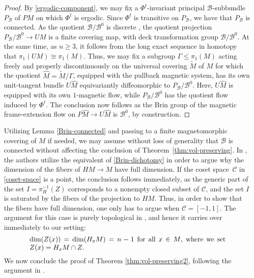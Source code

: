 \documentclass[10pt,a4paper]{amsart}
\numberwithin{equation}{section}
\theoremstyle{definition}
\begin{document}
\begin{proof}
 By \eqref{ergodic-component}, we may fix a $\Phi^t$-invariant principal $\mathcal{B}$-subbundle $P_{\mathcal{B}}$ of $PM$ on which $\Phi^t$ is ergodic. Since $\Phi^t$ is transitive on $P_{\mathcal{B}}$, we have that $P_{\mathcal{B}}$ is connected. As the quotient $\mathcal{B}/\mathcal{B}^0$ is discrete \cite[Proposition 6.15]{MR4242835}, the quotient projection $P_{\mathcal{B}} / \mathcal{B}^0 \to UM$ is a finite covering map, with deck transformation group $\mathcal{B}/\mathcal{B}^0$. At the same time, as $n\geq 3$, it follows from the long exact sequence in homotopy that $\pi_1(UM)\cong \pi_1(M)$. Thus, we may fix a subgroup $\Gamma \leq \pi_1(M)$ acting freely and properly discontinuously on the universal covering $\widetilde{M}$ of $M$ for which the quotient $\hat{M} = \widetilde{M}/\Gamma$, equipped with the pullback magnetic system, has its own unit-tangent bundle $U\hat{M}$ equivariantly diffeomorphic to $P_{\mathcal{B}}/\mathcal{B}^0$. Here, $U\hat{M}$ is equipped with its own $1$-magnetic flow, while $P_{\mathcal{B}}/\mathcal{B}^0$ has the quotient flow induced by $\Phi^t$. The conclusion now follows as the Brin group of the magnetic frame-extension flow on $P\hat{M}\to U\hat{M}$ is $\mathcal{B}^0$, by construction.
 \end{proof}

 Utilizing Lemma \ref{Brin-connected} and passing to a finite magnetomorphic covering of $M$ if needed, we may assume without loss of generality that $\mathcal{B}$ is connected without affecting the conclusion of Theorem~\ref{thm:vol-preserving}. In \cite[Proposition 3.3.6]{filip2024finiteness}, the authors utilize the equivalent of \eqref{Brin-dichotomy} in order to argue why the dimension of the fibers of $HM \rightarrow M$ have full dimension. If the coset space~$\mathcal{C}$ in \eqref{coset-space} is a point, the conclusion follows immediately, as the generic part of the set ${I = \pi_H^{-1}(Z)}$ corresponds to a nonempty closed subset of $\mathcal{C}$, and the set $I$ is saturated by the fibers of the projection to $HM$. Thus, in order to show that the fibers have full dimension, one only has to argue when $\mathcal{C} = [-1,1]$. The argument for this case is purely topological in \cite[Proposition~3.3.6]{filip2024finiteness}, and hence it carries over immediately to our setting:
\begin{equation}\label{full-dim}
 \parbox{.83\textwidth}{$\dim(Z(x)) = \dim (H_xM) = n-1$ for all $x\in M$, where we set $Z(x) = H_xM\cap Z$.}\end{equation}
We now conclude the proof of Theorem \ref{thm:vol-preserving2}, following the argument in \cite[Section 3.3.7]{filip2024finiteness}.
\end{document}
